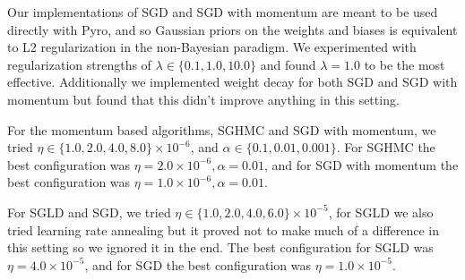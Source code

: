 Our implementations of SGD and SGD with momentum are meant to be used directly with Pyro, and so Gaussian priors on the weights and biases is equivalent to L2 regularization in the non-Bayesian paradigm. We experimented with regularization strengths of $\lambda \in \{0.1, 1.0, 10.0\}$ and found $\lambda = 1.0$ to be the most effective. Additionally we implemented weight decay for both SGD and SGD with momentum but found that this didn't improve anything in this setting.

For the momentum based algorithms, SGHMC and SGD with momentum, we tried $\eta \in \{1.0, 2.0, 4.0, 8.0 \} \times 10^{-6}$, and $\alpha \in \{0.1, 0.01, 0.001 \}$. For SGHMC the best configuration was $\eta = 2.0\times 10^{-6}, \alpha=0.01$, and for SGD with momentum the best configuration was $\eta = 1.0\times 10^{-6}, \alpha=0.01$.

For SGLD and SGD, we tried $\eta \in \{1.0, 2.0, 4.0, 6.0\} \times 10^{-5}$, for SGLD we also tried learning rate annealing but it proved not to make much of a difference in this setting so we ignored it in the end. The best configuration for SGLD was $\eta = 4.0\times 10^{-5}$, and for SGD the best configuration was $\eta = 1.0\times 10^{-5}$.

